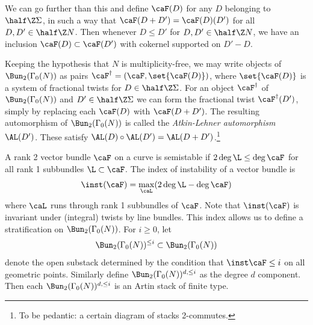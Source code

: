 \documentclass{article}
\begin{document}
 We can go further than this and define $\caF(D)$ for any $D$ belonging to $\half \Z \Sigma$, in such a way that $\caF(D+D')=\caF(D)(D')$ for all $D,D'\in\half\Z N$. Then whenever $D\leq D'$ for $D,D'\in \half \Z N$, we have an inclusion $\caF(D)\subset \caF(D')$ with cokernel supported on $D'-D$.  

Keeping the hypothesis that $N$ is multiplicity-free, we may write objects of $\Bun_2(\Gamma_0(N))$ as pairs $\caF^\dagger = (\caF,\set{\caF(D)})$, where $\set{\caF(D)}$ is a system of fractional twists for $D\in \half\Z \Sigma$.  For an object $\caF^\dagger$ of $\Bun_2(\Gamma_0(N))$ and $D'\in \half\Z \Sigma$ we can form the fractional twist $\caF^\dagger(D')$, simply by replacing each $\caF(D)$ with $\caF(D+D')$.  The resulting automorphism of $\Bun_2(\Gamma_0(N))$ is called the {\em Atkin-Lehner automorphism} $\AL(D')$.  These satisfy $\AL(D)\circ \AL(D')=\AL(D+D')$.\footnote{To be pedantic:  a certain diagram of stacks 2-commutes.}  
%

A rank 2 vector bundle $\caF$ on a curve is semistable if $2\deg \L\leq \deg \caF$ for all rank 1 subbundles $\L\subset \caF$.  The index of instability of a vector bundle is 
\[ \inst(\caF) = \max_{\caL}(2\deg \L - \deg \caF) \]
 where $\caL$ runs through rank 1 subbundles of $\caF$.  Note that $\inst(\caF)$ is invariant under (integral) twists by line bundles.   This index allows us to define a stratification on $\Bun_2(\Gamma_0(N))$.
 For $i\geq 0$, let 
 \[ \Bun_2(\Gamma_0(N))^{\leq i} \subset \Bun_2(\Gamma_0(N)) \]
 denote the open substack determined by the condition that $\inst \caF\leq i$ on all geometric points.
 Similarly define $\Bun_2(\Gamma_0(N))^{d,\leq i}$ as the degree $d$ component.  Then each $\Bun_2(\Gamma_0(N))^{d,\leq i}$ is an Artin stack of finite type.
% 
\end{document}
